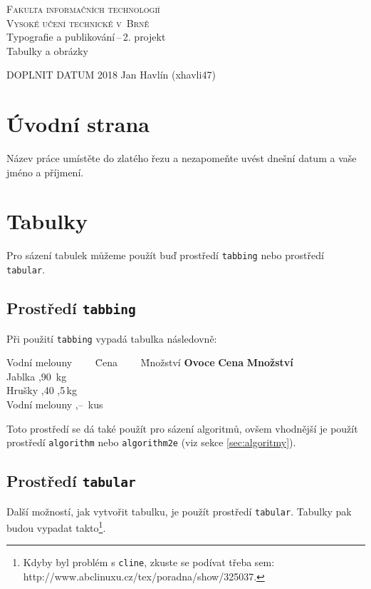 \documentclass[11pt,a4paper]{article}
\begin{document}
\begin{titlepage}
\begin{center}
	\Huge
	\textsc{Fakulta informačních technologií} \\
	\textsc{Vysoké učení technické v~Brně}\\
	\LARGE
	Typografie a publikování\,--\,2. projekt \\
	Tabulky a obrázky
\end{center}
{\Large DOPLNIT DATUM 2018 \hfill Jan Havlín (xhavli47)}
\end{titlepage}

\section{Úvodní strana}
Název práce umístěte do zlatého řezu a nezapomeňte uvést dnešní datum a vaše jméno a příjmení.

\section{Tabulky}
Pro sázení tabulek můžeme použít buď prostředí \verb|tabbing| nebo prostředí \verb|tabular|.

\subsection{Prostředí \texttt{tabbing}}
Při použití \verb|tabbing| vypadá tabulka následovně:
\begin{tabbing}
Vodní melouny~~~~ \= Cena~~~~ \= Množství \kill
\textbf{Ovoce} \> \textbf{Cena} \> \textbf{Množství} \\
Jablka ,90 \,kg \\
Hrušky ,40 ,5\,kg \\
Vodní melouny ,-- \,kus \\
\end{tabbing}

\noindent Toto prostředí se dá také použít pro sázení algoritmů, ovšem vhodnější je použít prostředí \verb|algorithm| nebo \verb|algorithm2e| (viz sekce \ref{sec:algoritmy}).

\subsection{Prostředí \texttt{tabular}}
Další možností, jak vytvořit tabulku, je použít prostředí \verb|tabular|. Tabulky pak budou vypadat takto\footnote{Kdyby byl problém s \texttt{cline}, zkuste se podívat třeba sem: http://www.abclinuxu.cz/tex/poradna/show/325037.}.
\end{document}
